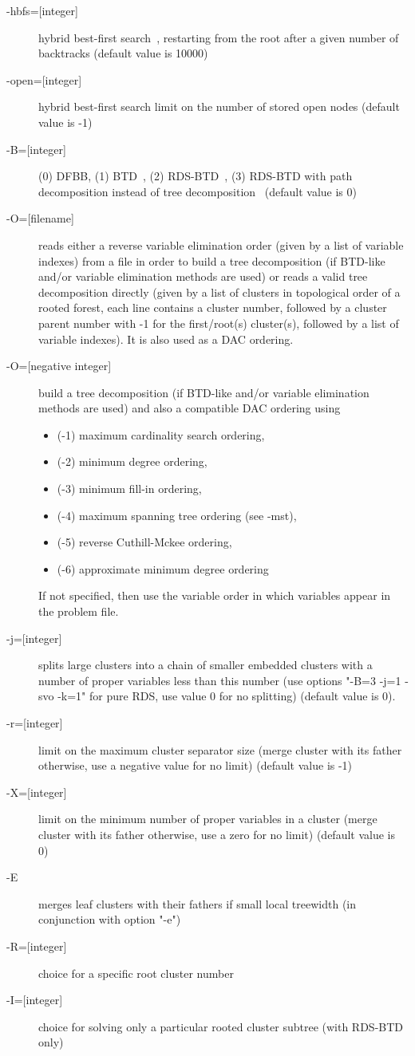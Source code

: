 \documentclass{article}
\begin{document}
\begin{description}
\item[{-hbfs=[integer]}] hybrid best-first search~\cite{Katsirelos15a}, restarting from the
  root after a given number of backtracks (default value is 10000)
\item[{-open=[integer]}] hybrid best-first search limit on the number
  of stored open nodes (default value is -1)
\item[{-B=[integer]}] (0) DFBB, (1) BTD~\cite{Schiex06a}, (2) RDS-BTD~\cite{Sanchez09a}, (3) RDS-BTD with
  path decomposition instead of tree decomposition~\cite{Sanchez09a} (default value is
  0)
\item[{-O=[filename]}] reads either a reverse variable elimination order (given by a list of variable indexes) from a file
  in order to build a tree decomposition (if BTD-like and/or variable
  elimination methods are used) or reads a valid tree decomposition directly (given by a list of clusters in topological order of a rooted forest, each line contains a cluster number, followed by a cluster parent number with -1 for the first/root(s) cluster(s), followed by a list of variable indexes). It is also used as a DAC ordering.
\item[{-O=[negative integer]}] build a tree decomposition (if BTD-like
  and/or variable elimination methods are used) and also a compatible
  DAC ordering using
  \begin{itemize}
    \item (-1) maximum cardinality search ordering, 
    \item (-2) minimum degree ordering, 
    \item (-3) minimum fill-in ordering,
    \item (-4) maximum spanning tree ordering (see -mst), 
    \item (-5) reverse Cuthill-Mckee ordering, 
    \item (-6) approximate minimum degree ordering
    \end{itemize}
    If not specified, then use the variable order in which variables appear in the problem file.
\item[{-j=[integer]}] splits large clusters into a chain of smaller embedded clusters with a number of proper variables less than this number (use options "-B=3 -j=1 -svo -k=1" for pure RDS, use value 0 for no splitting) (default value is 0).
\item[{-r=[integer]}] limit on the maximum cluster separator size (merge cluster with its father otherwise, use a negative value for no limit) (default value is -1)
\item[{-X=[integer]}] limit on the minimum number of proper variables in a cluster (merge cluster with its father otherwise, use a zero for no limit) (default value is 0)
\item[{-E}] merges leaf clusters with their fathers if small local treewidth (in conjunction with option "-e")
\item[{-R=[integer]}] choice for a specific root cluster number
\item[{-I=[integer]}] choice for solving only a particular rooted cluster subtree (with RDS-BTD only)
 \end{description}
 
\end{document}
